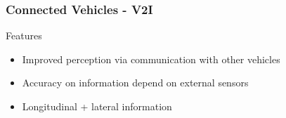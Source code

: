 \begin{frame}
\frametitle{Connected Vehicles - V2I}
    \begin{center}
        \resizebox{0.9\linewidth}{!}{%
            
        }
        \begin{exampleblock}{Features}
            \begin{itemize}
                \item Improved perception via communication with other vehicles
                \item Accuracy on information depend on external sensors
                \item Longitudinal + lateral information 
            \end{itemize}
        \end{exampleblock}
    \end{center}
\end{frame}